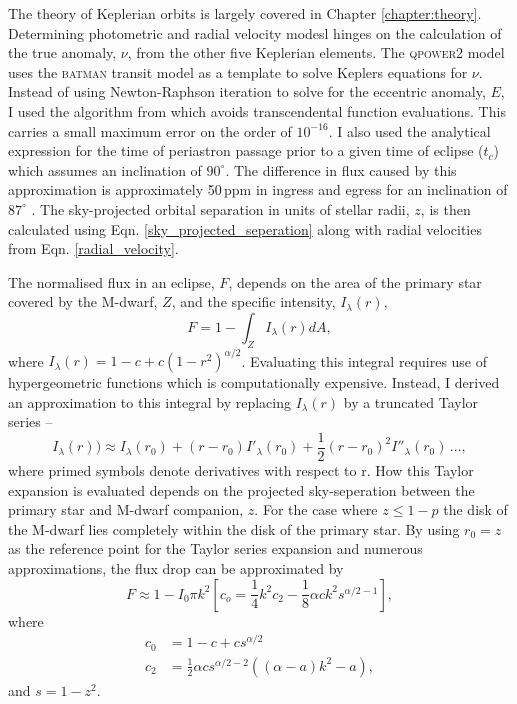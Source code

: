 The theory of Keplerian orbits is largely covered in Chapter \ref{chapter:theory}. Determining photometric and radial velocity modesl hinges on the calculation of the true anomaly, $\nu$, from the other five Keplerian elements. The \textsc{qpower2} model uses the \textsc{batman} transit model \citep{2015PASP..127.1161K} as a template to solve Keplers equations for $\nu$. Instead of using Newton-Raphson iteration to solve for the eccentric anomaly, $E$, I used the algorithm from \citet{1997CeMDA..66..309F} which avoids transcendental function evaluations. This carries a small maximum error on the order of $10^{-16}$. I also used the analytical expression for the time of periastron passage prior to a given time of eclipse ($t_c$) which assumes an inclination of $90^\circ$. The difference in flux caused by this approximation is approximately 50\,ppm in ingress and egress for an inclination of $87^\circ$ \citep{2016A26A...591A.111M}. The sky-projected orbital separation in units of stellar radii, $z$, is then calculated using Eqn. \ref{sky_projected_seperation} along with radial velocities from Eqn. \ref{radial_velocity}. 

The normalised flux in an eclipse, $F$, depends on the area of the primary star covered by the M-dwarf, $Z$, and the specific intensity, $I_\lambda (r)$,
%
\begin{equation}
    F = 1 - \int_Z I_\lambda (r) dA ,
\end{equation}
%
where $I_\lambda (r) = 1 - c + c(1 - r^2)^{\alpha / 2}$. Evaluating this integral requires use of hypergeometric functions which is computationally expensive. Instead, I derived an approximation to this integral
by replacing $I_\lambda (r)$ by a truncated Taylor series --
%
\begin{equation}
    I_\lambda (r)) \approx  I_\lambda (r_0) + (r - r_0)I'_\lambda (r_0) + \frac{1}{2}(r - r_0)^2 I''_\lambda (r_0)\,...,
\end{equation}
%
where primed symbols denote derivatives with respect to r. How this Taylor expansion is evaluated depends on the projected sky-seperation between the primary star and M-dwarf companion, $z$. For the case where $z \leq 1 - p$ the disk of the M-dwarf lies completely within the disk of the primary star. By using $r_0 = z$ as the reference point for the Taylor series expansion and numerous approximations, the flux drop can be approximated by
%
\begin{equation}
    F \approx 1 - I_0 \pi k^2 \left[c_o = \frac{1}{4} k^2 c_2 - \frac{1}{8} \alpha c k^2 s^{\alpha/2 - 1} \right],
\end{equation}
%
where
\begin{eqnarray}
c_0 &= 1 - c + c s^{\alpha/2} \\
c_2 &= \frac{1}{2} \alpha c s^{\alpha /2 - 2}\left( (\alpha - a) k^2 - a \right),
\end{eqnarray}
and $s = 1 - z^2$.

